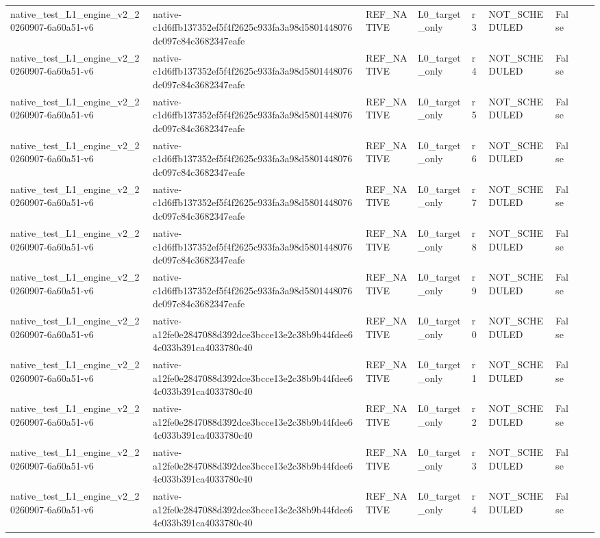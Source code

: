 \begin{tabular}{lllllllll}
native\_test\_L1\_engine\_v2\_20260907-6a60a51-v6 & native-c1d6ffb137352ef5f4f2625c933fa3a98d5801448076dc097c84c3682347eafe & REF\_NATIVE & L0\_target\_only & r3 & NOT\_SCHEDULED & False &  &  \\
native\_test\_L1\_engine\_v2\_20260907-6a60a51-v6 & native-c1d6ffb137352ef5f4f2625c933fa3a98d5801448076dc097c84c3682347eafe & REF\_NATIVE & L0\_target\_only & r4 & NOT\_SCHEDULED & False &  &  \\
native\_test\_L1\_engine\_v2\_20260907-6a60a51-v6 & native-c1d6ffb137352ef5f4f2625c933fa3a98d5801448076dc097c84c3682347eafe & REF\_NATIVE & L0\_target\_only & r5 & NOT\_SCHEDULED & False &  &  \\
native\_test\_L1\_engine\_v2\_20260907-6a60a51-v6 & native-c1d6ffb137352ef5f4f2625c933fa3a98d5801448076dc097c84c3682347eafe & REF\_NATIVE & L0\_target\_only & r6 & NOT\_SCHEDULED & False &  &  \\
native\_test\_L1\_engine\_v2\_20260907-6a60a51-v6 & native-c1d6ffb137352ef5f4f2625c933fa3a98d5801448076dc097c84c3682347eafe & REF\_NATIVE & L0\_target\_only & r7 & NOT\_SCHEDULED & False &  &  \\
native\_test\_L1\_engine\_v2\_20260907-6a60a51-v6 & native-c1d6ffb137352ef5f4f2625c933fa3a98d5801448076dc097c84c3682347eafe & REF\_NATIVE & L0\_target\_only & r8 & NOT\_SCHEDULED & False &  &  \\
native\_test\_L1\_engine\_v2\_20260907-6a60a51-v6 & native-c1d6ffb137352ef5f4f2625c933fa3a98d5801448076dc097c84c3682347eafe & REF\_NATIVE & L0\_target\_only & r9 & NOT\_SCHEDULED & False &  &  \\
native\_test\_L1\_engine\_v2\_20260907-6a60a51-v6 & native-a12fe0e2847088d392dce3bcce13e2c38b9b44fdee64c033b391ca4033780c40 & REF\_NATIVE & L0\_target\_only & r0 & NOT\_SCHEDULED & False &  &  \\
native\_test\_L1\_engine\_v2\_20260907-6a60a51-v6 & native-a12fe0e2847088d392dce3bcce13e2c38b9b44fdee64c033b391ca4033780c40 & REF\_NATIVE & L0\_target\_only & r1 & NOT\_SCHEDULED & False &  &  \\
native\_test\_L1\_engine\_v2\_20260907-6a60a51-v6 & native-a12fe0e2847088d392dce3bcce13e2c38b9b44fdee64c033b391ca4033780c40 & REF\_NATIVE & L0\_target\_only & r2 & NOT\_SCHEDULED & False &  &  \\
native\_test\_L1\_engine\_v2\_20260907-6a60a51-v6 & native-a12fe0e2847088d392dce3bcce13e2c38b9b44fdee64c033b391ca4033780c40 & REF\_NATIVE & L0\_target\_only & r3 & NOT\_SCHEDULED & False &  &  \\
native\_test\_L1\_engine\_v2\_20260907-6a60a51-v6 & native-a12fe0e2847088d392dce3bcce13e2c38b9b44fdee64c033b391ca4033780c40 & REF\_NATIVE & L0\_target\_only & r4 & NOT\_SCHEDULED & False &  &  \\

\end{tabular}
